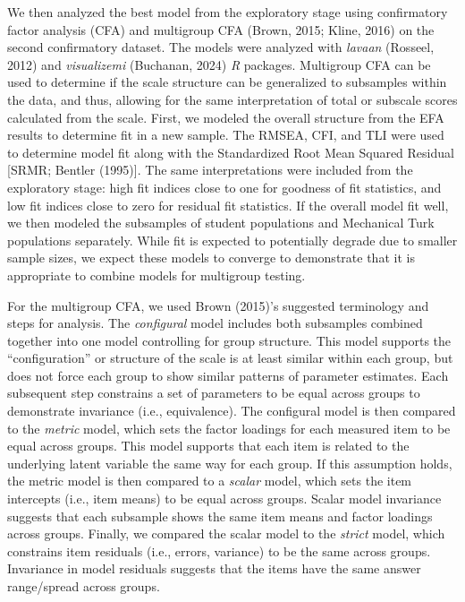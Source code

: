 \documentclass[
  english,
  man]{apa6}
\begin{document}
We then analyzed the best model from the exploratory stage using
confirmatory factor analysis (CFA) and multigroup CFA (Brown, 2015; Kline, 2016) on the second confirmatory dataset. The models were analyzed
with \emph{lavaan} (Rosseel, 2012) and \emph{visualizemi} (Buchanan, 2024) \emph{R}
packages. Multigroup CFA can be used to determine if the scale structure
can be generalized to subsamples within the data, and thus, allowing for
the same interpretation of total or subscale scores calculated from the
scale. First, we modeled the overall structure from the EFA results to
determine fit in a new sample. The RMSEA, CFI, and TLI were used to
determine model fit along with the Standardized Root Mean Squared
Residual {[}SRMR; Bentler (1995){]}. The same interpretations were included
from the exploratory stage: high fit indices close to one for goodness
of fit statistics, and low fit indices close to zero for residual fit
statistics. If the overall model fit well, we then modeled the
subsamples of student populations and Mechanical Turk populations
separately. While fit is expected to potentially degrade due to smaller
sample sizes, we expect these models to converge to demonstrate that it
is appropriate to combine models for multigroup testing.

For the multigroup CFA, we used Brown (2015)'s suggested terminology and
steps for analysis. The \emph{configural} model includes both subsamples
combined together into one model controlling for group structure. This
model supports the ``configuration'' or structure of the scale is at least
similar within each group, but does not force each group to show similar
patterns of parameter estimates. Each subsequent step constrains a set
of parameters to be equal across groups to demonstrate invariance (i.e.,
equivalence). The configural model is then compared to the \emph{metric}
model, which sets the factor loadings for each measured item to be equal
across groups. This model supports that each item is related to the
underlying latent variable the same way for each group. If this
assumption holds, the metric model is then compared to a \emph{scalar} model,
which sets the item intercepts (i.e., item means) to be equal across
groups. Scalar model invariance suggests that each subsample shows the
same item means and factor loadings across groups. Finally, we compared
the scalar model to the \emph{strict} model, which constrains item residuals
(i.e., errors, variance) to be the same across groups. Invariance in
model residuals suggests that the items have the same answer
range/spread across groups.
\end{document}
